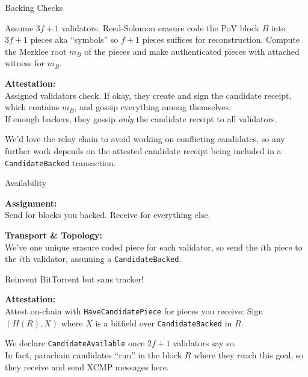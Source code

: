 \documentclass{beamer}
\begin{document}
\begin{frame}[t]{Backing Checks}

Assume $3f+1$ validators.  Reed-Solomon erasure code the PoV block $B$ into $3f+1$ pieces aka ``symbols'' so $f+1$ pieces suffices for reconstruction.  Compute the Merklee root $m_B$ of the pieces and make authenticated pieces with attached witness for $m_B$.

\bigskip

{\bf Attestation:} \\ \smallskip
Assigned validators check.  If okay, they create and sign the candidate receipt, which contains $m_B$, and gossip everything among themselves.  \\ \smallskip
If enough backers, they gossip {\em only} the candidate receipt to all validators.

\bigskip

We'd love the relay chain to avoid working on conflicting candidates, so any further work depends on the attested candidate receipt being included in a \texttt{CandidateBacked} transaction.

\end{frame}


\begin{frame}[t]{Availability}

{\bf Assignment:}  \\ \smallskip
Send for blocks you backed.  Receive for everything else.

\bigskip

{\bf Transport \& Topology:} \\ \smallskip
We've one unique erasure coded piece for each validator, so send the $i$th piece to the $i$th validator, assuming a \texttt{CandidateBacked}.  \\ \smallskip

\hspace*{10pt} Reinvent BitTorrent but sans tracker!  

\bigskip

{\bf Attestation:}  \\ \smallskip
Attest on-chain with \texttt{HaveCandidatePiece} for pieces you receive:  Sign $(H(R),X)$ where $X$ is a bitfield over \texttt{CandidateBacked} in $R$. 

\bigskip

We declare \texttt{CandidateAvailable} once $2f+1$ validators say so. \\
In fact, parachain candidates ``run'' in the block $R$ where they reach this goal, so they receive and send XCMP messages here.

\end{frame}
\end{document}
